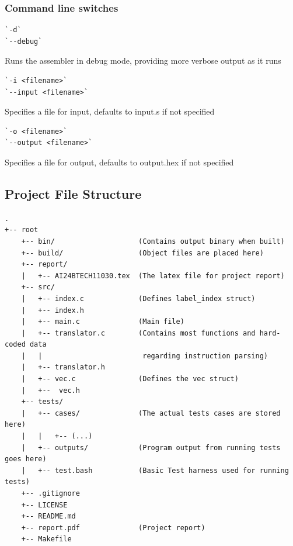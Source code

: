 \documentclass[12pt]{article}
\begin{document}
    \subsubsection*{Command line switches}
    \begin{verbatim}
`-d` 
`--debug`\end{verbatim}
    Runs the assembler in debug mode, providing more verbose output as it runs
    \\
    
    \begin{verbatim}
`-i <filename>`
`--input <filename>`\end{verbatim}
    Specifies a file for input, defaults to input.s if not specified
    \\
    
    \begin{verbatim}
`-o <filename>`
`--output <filename>`\end{verbatim}
    Specifies a file for output, defaults to output.hex if not specified

    \newpage
    \subsection{Project File Structure}

    \begin{verbatim}
.
+-- root
    +-- bin/                    (Contains output binary when built)
    +-- build/                  (Object files are placed here)
    +-- report/
    |   +-- AI24BTECH11030.tex  (The latex file for project report)
    +-- src/
    |   +-- index.c             (Defines label_index struct)
    |   +-- index.h
    |   +-- main.c              (Main file)
    |   +-- translator.c        (Contains most functions and hard-coded data 
    |   |                        regarding instruction parsing)
    |   +-- translator.h
    |   +-- vec.c               (Defines the vec struct)
    |   +--  vec.h
    +-- tests/
    |   +-- cases/              (The actual tests cases are stored here)
    |   |   +-- (...)
    |   +-- outputs/            (Program output from running tests goes here)
    |   +-- test.bash           (Basic Test harness used for running tests)
    +-- .gitignore
    +-- LICENSE
    +-- README.md
    +-- report.pdf              (Project report)
    +-- Makefile\end{verbatim}
    
\end{document}
